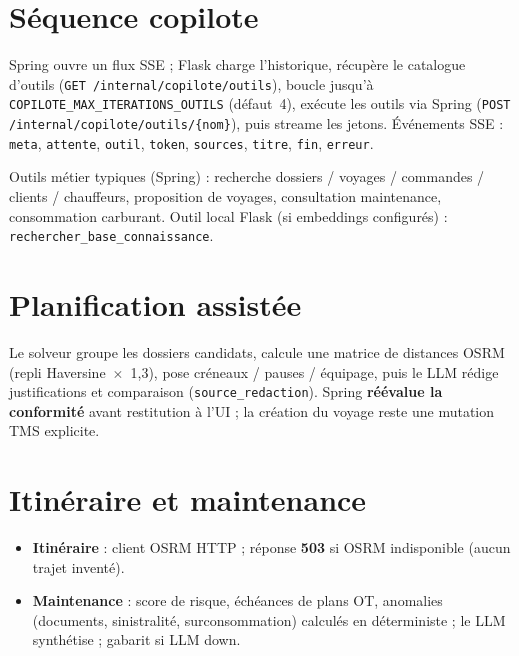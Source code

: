 \section{Séquence copilote}

Spring ouvre un flux SSE ; Flask charge l'historique, récupère le catalogue d'outils
(\texttt{GET /internal/copilote/outils}), boucle jusqu'à \texttt{COPILOTE\_MAX\_ITERATIONS\_OUTILS}
(défaut~4), exécute les outils via Spring (\texttt{POST /internal/copilote/outils/\{nom\}}),
puis streame les jetons. Événements SSE : \texttt{meta}, \texttt{attente}, \texttt{outil},
\texttt{token}, \texttt{sources}, \texttt{titre}, \texttt{fin}, \texttt{erreur}.

Outils métier typiques (Spring) : recherche dossiers / voyages / commandes / clients / chauffeurs,
proposition de voyages, consultation maintenance, consommation carburant. Outil local Flask
(si embeddings configurés) : \texttt{rechercher\_base\_connaissance}.


\section{Planification assistée}

Le solveur groupe les dossiers candidats, calcule une matrice de distances OSRM
(repli Haversine~$\times$~1,3), pose créneaux / pauses / équipage, puis le LLM rédige
justifications et comparaison (\texttt{source\_redaction}). Spring \textbf{réévalue la conformité}
avant restitution à l'UI ; la création du voyage reste une mutation TMS explicite.


\section{Itinéraire et maintenance}

\begin{itemize}[leftmargin=*]
  \item \textbf{Itinéraire} : client OSRM HTTP ; réponse \textbf{503} si OSRM indisponible (aucun trajet inventé).
  \item \textbf{Maintenance} : score de risque, échéances de plans OT, anomalies (documents, sinistralité, surconsommation) calculés en déterministe ; le LLM synthétise ; gabarit si LLM down.
\end{itemize}

